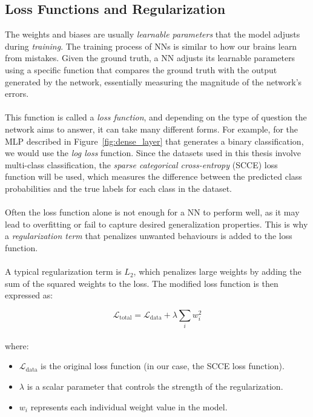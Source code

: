 \subsection{Loss Functions and Regularization}
\label{subsec:lossregularization}
The weights and biases are usually \textit{learnable parameters}
that the model adjusts during \textit{training}.
The training process of NNs is similar to how our brains learn from mistakes. 
Given the ground truth, a NN adjusts its learnable parameters 
using a specific function that compares the ground truth with the output generated by the network, 
essentially measuring the magnitude of the network's errors.
\\
\\
This function is called a \textit{loss function}, and depending on the type of question the network aims to answer, it can take many different forms.
For example, for the MLP described in Figure~\ref{fig:dense_layer} that generates a binary classification, we would use the \textit{log loss} function. 
Since the datasets used in this thesis involve multi-class classification, the \textit{sparse categorical cross-entropy} (SCCE) loss function will be used, 
which measures the difference between the predicted class probabilities and the true labels for each class in the dataset.
\\
\\
Often the loss function alone is not enough for a NN to perform well, 
as it may lead to overfitting or fail to capture desired generalization properties.
This is why a \textit{regularization term} that penalizes unwanted behaviours
is added to the loss function.
\\
\\
A typical regularization term is \( L_2 \), 
which penalizes large weights by adding the sum of the squared weights to the loss. 
The modified loss function is then expressed as:

\[
\mathcal{L}_{\text{total}} = \mathcal{L}_{\text{data}} + \lambda \sum_{i} w_i^2
\]
\\
\noindent where:

\begin{itemize}
  \item \( \mathcal{L}_{\text{data}} \) is the original loss function (in our case, the SCCE loss function).
  \item \( \lambda \) is a scalar parameter that controls the strength of the regularization.
  \item \( w_i \) represents each individual weight value in the model.
\end{itemize}


